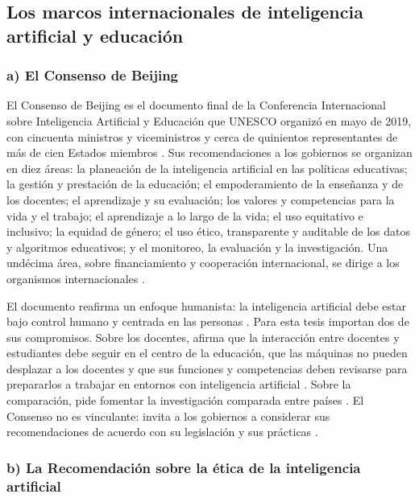 \subsection{Los marcos internacionales de inteligencia artificial y educación}
\label{subsec:mt-marcos}

\subsubsection*{a) El Consenso de Beijing}

El Consenso de Beijing es el documento final de la Conferencia Internacional sobre
Inteligencia Artificial y Educación que UNESCO organizó en mayo de 2019, con cincuenta
ministros y viceministros y cerca de quinientos representantes de más de cien Estados
miembros \citep[párr.~1]{unesco2019beijing}. Sus recomendaciones a los gobiernos se
organizan en diez áreas: la planeación de la inteligencia artificial en las políticas
educativas; la gestión y prestación de la educación; el empoderamiento de la enseñanza y de
los docentes; el aprendizaje y su evaluación; los valores y competencias para la vida y el
trabajo; el aprendizaje a lo largo de la vida; el uso equitativo e inclusivo; la equidad de
género; el uso ético, transparente y auditable de los datos y algoritmos educativos; y el
monitoreo, la evaluación y la investigación. Una undécima área, sobre financiamiento y
cooperación internacional, se dirige a los organismos internacionales
\citep[párrs.~8--38]{unesco2019beijing}.

El documento reafirma un enfoque humanista: la inteligencia artificial debe estar bajo
control humano y centrada en las personas \citep[párrs.~6--7]{unesco2019beijing}. Para esta
tesis importan dos de sus compromisos. Sobre los docentes, afirma que la interacción entre
docentes y estudiantes debe seguir en el centro de la educación, que las máquinas no pueden
desplazar a los docentes y que sus funciones y competencias deben revisarse para prepararlos
a trabajar en entornos con inteligencia artificial \citep[párrs.~12--13]{unesco2019beijing}.
Sobre la comparación, pide fomentar la investigación comparada entre países
\citep[párr.~31]{unesco2019beijing}. El Consenso no es vinculante: invita a los gobiernos a
considerar sus recomendaciones de acuerdo con su legislación y sus prácticas
\citep[p.~4]{unesco2019beijing}.

\subsubsection*{b) La Recomendación sobre la ética de la inteligencia artificial}


